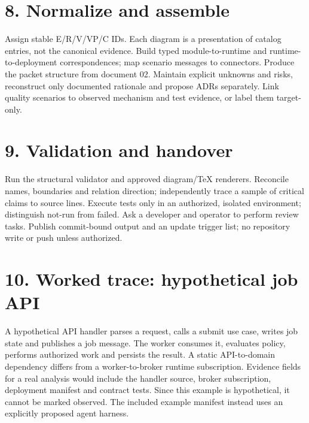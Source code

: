 \documentclass[11pt,letterpaper]{article}
\begin{document}
\section*{8. Normalize and assemble}
Assign stable E/R/V/VP/C IDs. Each diagram is a presentation of catalog entries, not the canonical evidence. Build typed module-to-runtime and runtime-to-deployment correspondences; map scenario messages to connectors. Produce the packet structure from document 02. Maintain explicit unknowns and risks, reconstruct only documented rationale and propose ADRs separately. Link quality scenarios to observed mechanism and test evidence, or label them target-only.\par\smallskip
\section*{9. Validation and handover}
Run the structural validator and approved diagram/TeX renderers. Reconcile names, boundaries and relation direction; independently trace a sample of critical claims to source lines. Execute tests only in an authorized, isolated environment; distinguish not-run from failed. Ask a developer and operator to perform review tasks. Publish commit-bound output and an update trigger list; no repository write or push unless authorized.\par\smallskip
\section*{10. Worked trace: hypothetical job API}
A hypothetical API handler parses a request, calls a submit use case, writes job state and publishes a job message. The worker consumes it, evaluates policy, performs authorized work and persists the result. A static API-to-domain dependency differs from a worker-to-broker runtime subscription. Evidence fields for a real analysis would include the handler source, broker subscription, deployment manifest and contract tests. Since this example is hypothetical, it cannot be marked observed. The included example manifest instead uses an explicitly proposed agent harness.\par\smallskip
\end{document}
